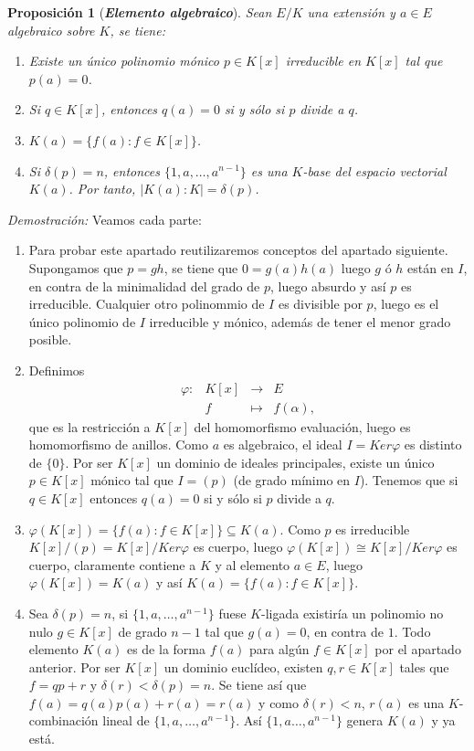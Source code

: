 \documentclass[12pt]{article}
\newtheorem{proposition}[theorem]{Proposición}
\begin{document}
\begin{proposition}[\textbf{\textit{Elemento algebraico}}] Sean $E/K$ una extensión y $a \in E$ algebraico sobre $K$, se tiene: 
\begin{enumerate}
\item Existe un único polinomio mónico $p \in K[x]$ irreducible en $K[x]$ tal que $p(a) = 0$.
\item Si $q\in K[x]$, entonces $q(a) = 0$ si y sólo si $p$ divide a $q$.
\item $K(a) = \lbrace f(a): f \in K[x] \rbrace$.
\item Si $\delta (p) = n$, entonces $\lbrace 1, a, \ldots, a^{n-1} \rbrace$ es una $K$-base del espacio vectorial $K(a)$. Por tanto, $|K(a):K | = \delta(p)$.
\end{enumerate}
\end{proposition}
\emph{Demostración: }Veamos cada parte: 
\begin{enumerate}
\item Para probar este apartado reutilizaremos conceptos del apartado siguiente. Supongamos que $p = gh$, se tiene que $0 = g(a)h(a)$ luego $g$ ó $h$ están en $I$, en contra de la minimalidad del grado de $p$, luego absurdo y así $p$ es irreducible. Cualquier otro polinommio de $I$ es divisible por $p$, luego es el único polinomio de $I$ irreducible y mónico, además de tener el menor grado posible.
\item Definimos $$\begin{array}{rccl}
\varphi \colon &K[x]&\longrightarrow &E \\
&f& \longmapsto &f(\alpha),
\end{array}
$$ que es la restricción a $K[x]$ del homomorfismo evaluación, luego es homomorfismo de anillos. Como $a$ es algebraico, el ideal $I = Ker \varphi$ es distinto de $\lbrace 0 \rbrace$. Por ser $K[x]$ un dominio de ideales principales, existe un único $p \in K[x]$ mónico tal que $I = (p)$ (de grado mínimo en $I$). Tenemos que si $q \in K[x]$ entonces $q(a) = 0$ si y sólo si $p$ divide a $q$.
\item $\varphi(K[x]) = \lbrace f(a) : f \in K[x] \rbrace \subseteq K(a)$. Como $p$ es irreducible $K[x]/(p) = K[x]/Ker\varphi$ es cuerpo, luego $\varphi(K[x]) \cong K[x]/Ker\varphi$ es cuerpo, claramente contiene a $K$ y al elemento $a \in E$, luego $\varphi(K[x]) = K(a)$ y así $K(a) = \lbrace f(a) : f \in K[x] \rbrace.$
\item Sea $\delta(p)=n$, si $\lbrace 1, a, \ldots, a^{n-1} \rbrace$ fuese $K$-ligada existiría un polinomio no nulo $g \in K[x]$ de grado $n-1$ tal que $g(a) = 0$, en contra de $1.$ Todo elemento $K(a)$ es de la forma $f(a)$ para algún $f \in K[x]$ por el apartado anterior. Por ser $K[x]$ un dominio euclídeo, existen $q, r \in K[x]$ tales que $f = qp + r$ y $\delta (r) < \delta(p)=n$. Se tiene así que $f(a) = q(a)p(a) +r(a) = r(a)$ y como $\delta(r) <n$, $r(a)$ es una $K$-combinación lineal de $\lbrace 1, a, \ldots, a^{n-1} \rbrace$. Así $\lbrace 1,a \ldots, a^{n-1}\rbrace$ genera $K(a)$ y ya está.
\end{enumerate}
\end{document}
